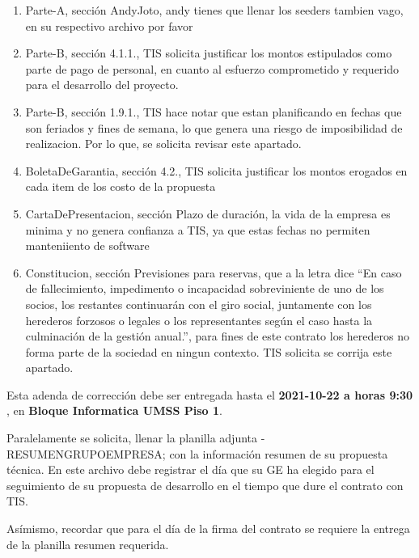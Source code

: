 \documentclass[10pt,letterpaper]{article}
\begin{document}
	\begin{enumerate}
\item Parte-A, sección AndyJoto, andy tienes que llenar los seeders tambien vago, en su respectivo archivo por favor
\item Parte-B, sección 4.1.1., TIS solicita justificar los montos estipulados como parte de pago de personal, en
cuanto al esfuerzo comprometido y requerido para el desarrollo del proyecto.
\item Parte-B, sección 1.9.1., TIS hace notar que estan planificando en fechas que son feriados y fines de semana,
lo que genera una riesgo de imposibilidad de realizacion. Por lo que, se solicita revisar este apartado.
\item BoletaDeGarantia, sección 4.2., TIS solicita justificar los montos erogados en cada item de los costo de la propuesta
\item CartaDePresentacion, sección Plazo de duración, la vida de la empresa es minima y no genera
confianza a TIS, ya que estas fechas no permiten manteniiento de software

\item Constitucion, sección Previsiones para reservas, que a la letra dice “En caso de fallecimiento, impedimento o incapacidad sobreviniente de uno de los socios, los restantes continuarán con
el giro social, juntamente con los herederos forzosos o legales o los representantes según el caso hasta la
culminación de la gestión anual.”, para fines de este contrato los herederos no forma parte de la sociedad
en ningun contexto. TIS solicita se corrija este apartado.
	\end{enumerate}
Esta adenda de corrección debe ser entregada hasta el \textbf{2021-10-22 a horas 9:30} , en \textbf{ Bloque Informatica UMSS Piso 1}.


Paralelamente se solicita, llenar la planilla adjunta - RESUMENGRUPOEMPRESA; con la información resumen de su propuesta técnica. En este archivo debe registrar el día que su GE ha elegido para el seguimiento de su propuesta de desarrollo en el tiempo que dure el contrato con TIS.


Asímismo, recordar que para el día de la firma del contrato se requiere la entrega de la planilla resumen requerida.
\end{document}
